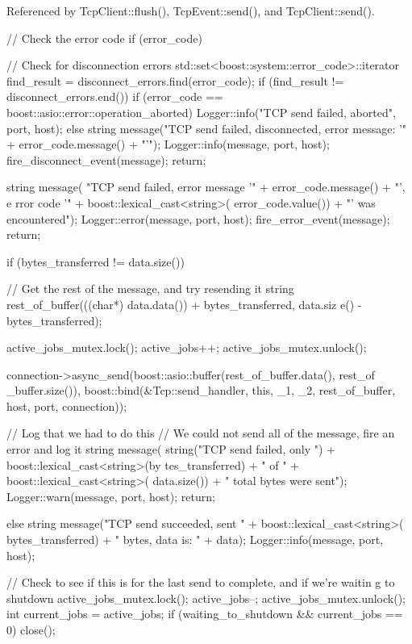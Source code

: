 Referenced by TcpClient::flush(), TcpEvent::send(), and TcpClient::send().


\begin{DoxyCode}
{
    // Check the error code
    if (error_code)
    {
        // Check for disconnection errors
        std::set<boost::system::error_code>::iterator find_result = 
      disconnect_errors.find(error_code);
        if (find_result != disconnect_errors.end())
        {
            if (error_code == boost::asio::error::operation_aborted)
            {
                Logger::info("TCP send failed, aborted", port, host);
            }
            else
            {
                string message("TCP send failed, disconnected, error message: '" 
      + error_code.message() + "'");
                Logger::info(message, port, host);
                fire_disconnect_event(message);
            }
            return;
        }

        string message(
                "TCP send failed, error message '" + error_code.message() + "', e
      rror code '" + boost::lexical_cast<string>(
                        error_code.value()) + "' was encountered");
        Logger::error(message, port, host);
        fire_error_event(message);
        return;
    }

    if (bytes_transferred != data.size())
    {
        // Get the rest of the message, and try resending it
        string rest_of_buffer(((char*) data.data()) + bytes_transferred, data.siz
      e() - bytes_transferred);

        active_jobs_mutex.lock();
        active_jobs++;
        active_jobs_mutex.unlock();

        connection->async_send(boost::asio::buffer(rest_of_buffer.data(), rest_of
      _buffer.size()),
                boost::bind(&Tcp::send_handler, this, _1, _2, rest_of_buffer, 
      host, port, connection));

        // Log that we had to do this
        // We could not send all of the message, fire an error and log it
        string message(
                string("TCP send failed, only ") + boost::lexical_cast<string>(by
      tes_transferred) + " of " + boost::lexical_cast<string>(
                        data.size()) + " total bytes were sent");
        Logger::warn(message, port, host);
        return;
    }
    else
    {
        string message("TCP send succeeded, sent " + boost::lexical_cast<string>(
      bytes_transferred) + " bytes, data is: " + data);
        Logger::info(message, port, host);
    }

    // Check to see if this is for the last send to complete, and if we're waitin
      g to shutdown
    active_jobs_mutex.lock();
    active_jobs--;
    active_jobs_mutex.unlock();
    int current_jobs = active_jobs;
    if (waiting_to_shutdown && current_jobs == 0)
    {
        close();
    }
}
\end{DoxyCode}
